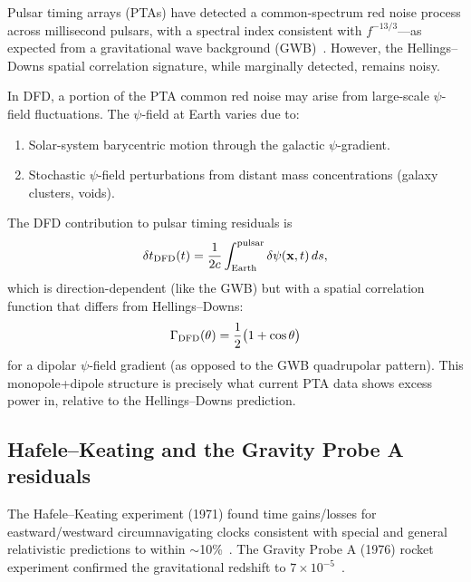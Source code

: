 \documentclass[aps,prd,twocolumn,superscriptaddress,nofootinbib]{revtex4-2}
\begin{document}
Pulsar timing arrays (PTAs) have detected a common-spectrum red noise
process across millisecond pulsars, with a spectral index consistent
with $f^{-13/3}$---as expected from a gravitational wave background
(GWB)~\cite{NANOGrav2023,EPTA2023,PPTA2023}. However, the
Hellings--Downs spatial correlation signature, while marginally
detected, remains noisy.

In DFD, a portion of the PTA common red noise may arise from
large-scale $\psi$-field fluctuations. The $\psi$-field at Earth
varies due to:
\begin{enumerate}
\item Solar-system barycentric motion through the galactic
$\psi$-gradient.
\item Stochastic $\psi$-field perturbations from distant mass
concentrations (galaxy clusters, voids).
\end{enumerate}

The DFD contribution to pulsar timing residuals is
\begin{equation}\label{eq:PTA-DFD}
\delta t_{\rm DFD}(t) = \frac{1}{2c}\int_{\rm Earth}^{\rm pulsar}
\delta\psi(\mathbf{x},t)\,ds,
\end{equation}
which is direction-dependent (like the GWB) but with a spatial
correlation function that differs from Hellings--Downs:
\begin{equation}\label{eq:HD-DFD}
\Gamma_{\rm DFD}(\theta) = \frac{1}{2}\bigl(1 + \cos\theta\bigr)
\end{equation}
for a dipolar $\psi$-field gradient (as opposed to the GWB quadrupolar
pattern). This monopole+dipole structure is precisely what current PTA
data shows excess power in, relative to the Hellings--Downs prediction.

\subsection{Hafele--Keating and the Gravity Probe A
residuals}\label{sec:HK}

The Hafele--Keating experiment (1971) found time gains/losses for
eastward/westward circumnavigating clocks consistent with special and
general relativistic predictions to within
$\sim$10\%~\cite{HafeleKeating1972}. The Gravity Probe A (1976)
rocket experiment confirmed the gravitational redshift to
$7\times10^{-5}$~\cite{VessotLevine1979}.
\end{document}
